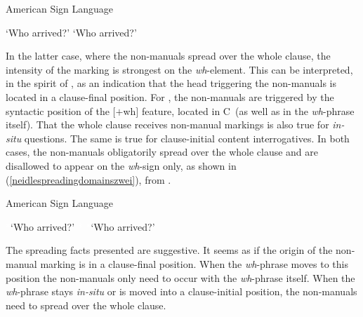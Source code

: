 \begin{exe}
\ex American Sign Language \citep[76]{neidle2002language}\label{neidlespreadingdomains}
\begin{xlist} 
\ex {} 
\glt `Who arrived?' \label{ex:neidlespreadingdomainsa} 
\ex {}
\glt `Who arrived?' \label{ex:neidlespreadingdomainsb} 
\end{xlist}
\end{exe}

\noindent In the latter case, where the non-manuals spread over the whole clause, the intensity of the marking is strongest on the \textit{wh}-element. This can be interpreted, in the spirit of \citet{bahan1996}, as an indication that the head triggering the non-manuals is located in a clause-final position. For \citet{neidle2002language}, the non-manuals are triggered by the syntactic position of the $[+$wh$]$ feature, located in C\textdegree\ (as well as in the \textit{wh}-phrase itself). That the whole clause receives non-manual markings is also true for \textit{in-situ} questions. The same is true for clause-initial content interrogatives. In both cases, the non-manuals obligatorily spread over the whole clause and are disallowed to appear on the \textit{wh}-sign only, as shown in (\ref{neidlespreadingdomainszwei}), from \citet[77]{neidle2002language}.

\begin{exe}
\ex American Sign Language \citep[77]{neidle2002language}\label{neidlespreadingdomainszwei}\begin{xlist} 
\ex *  
\glt \textcolor{white}{*}`Who arrived?' \label{ex:neidlespreadingdomainszweia} 
\ex\textcolor{white}{*}
\glt \textcolor{white}{*}`Who arrived?' \label{ex:neidlespreadingdomainszweib} 
\end{xlist}
\end{exe}

\noindent The spreading facts presented are suggestive. It seems as if the origin of the non-manual marking is in a clause-final position. When the \textit{wh}-phrase moves to this position the non-manuals only need to occur with the \textit{wh}-phrase itself. When the \textit{wh}-phrase stays \textit{in-situ} or is moved into a clause-initial position, the non-manuals need to spread over the whole clause. 

